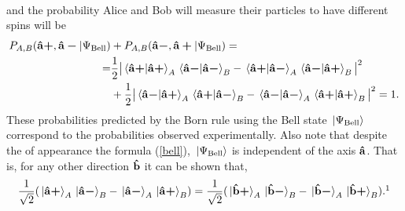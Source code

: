 {\begin{equation}
\begin{split}
\end{split}
\end{equation}
and the probability Alice and Bob will measure their particles to have different spins will be
\begin{equation}
\begin{split}
    P_{A,B}(\uvbp{a},\uvbm{a}|\Psi_{\text{Bell}})&+P_{A,B}(\uvbm{a},\uvbp{a}|\Psi_{\text{Bell}})= \\
    =&\frac{1}{2}\big| \ip*{\uvbp{a}}{\uvbp{a}}_A\ip*{\uvbm{a}}{\uvbm{a}}_B-\ip*{\uvbp{a}}{\uvbm{a}}_A\ip*{\uvbm{a}}{\uvbp{a}}_B\big|^2\\
    &+\frac{1}{2}\big|\ip*{\uvbm{a}}{\uvbp{a}}_A\ip*{\uvbp{a}}{\uvbm{a}}_B-\ip*{\uvbm{a}}{\uvbm{a}}_A\ip*{\uvbp{a}}{\uvbp{a}}_B\big|^2=1.
\end{split}
\end{equation}} 
These probabilities predicted by the Born rule using the Bell state $\ket*{\Psi_{\text{Bell}}}$ correspond to the probabilities observed experimentally. Also note that despite the of appearance the formula (\ref{bell}), $\ket*{\Psi_{\text{Bell}}}$ is independent of the axis $\vb{\hat{{a}}}$. That is, for any other direction $\vb{\hat{{b}}}$ it can be shown that,
\begin{equation}\label{bellstate2}\frac{1}{\sqrt{2}}(\ket*{\uvbp{a}}_A\ket*{\uvbm{a}}_B-\ket*{\uvbm{a}}_A\ket*{\uvbp{a}}_B)=\frac{1}{\sqrt{2}}(\ket*{\uvbp{b}}_A\ket*{\uvbm{b}}_B-\ket*{\uvbm{b}}_A\ket*{\uvbp{b}}_B).\protect\footnotemark\end{equation}
